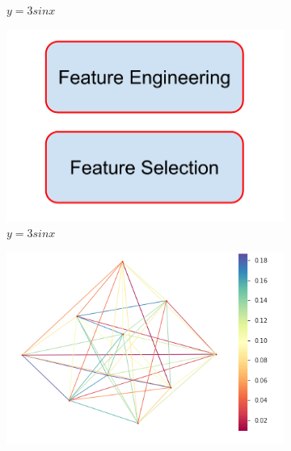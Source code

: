 \documentclass[msthesis.tex]{subfiles}
\begin{document}
\begin{figure}
\begin{subfigure}[b]{0.4\textwidth}
         \caption{$y=3sinx$}
         \label{fig:connectivity_matrix}
        \end{subfigure}
    \vfill
        \begin{subfigure}[b]{0.4\textwidth}
         \centering
         \includegraphics[height =0.8\textwidth,width=\textwidth]{images/Features.png}
         \caption{$y=3sinx$}
         \label{fig:three sin x}
         \end{subfigure}
    \hfill
        \begin{subfigure}[b]{0.4\textwidth}
         \centering
         \includegraphics[height =0.8\textwidth,width=\textwidth]{images/mews.png}

\end{subfigure}
\end{figure}
\end{document}
